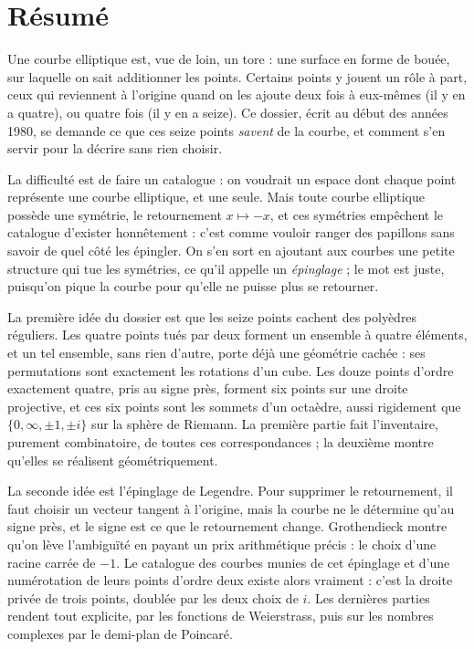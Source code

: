\documentclass[11pt,a4paper]{article}
\begin{document}
\section*{Résumé}

\begin{resume}
Une courbe elliptique est, vue de loin, un tore : une surface en forme de
bouée, sur laquelle on sait additionner les points. Certains points y jouent
un rôle à part, ceux qui reviennent à l'origine quand on les ajoute deux fois à
eux-mêmes (il y en a quatre), ou quatre fois (il y en a seize). Ce dossier,
écrit au début des années 1980, se demande ce que ces seize points
\emph{savent} de la courbe, et comment s'en servir pour la décrire sans rien
choisir.

La difficulté est de faire un catalogue : on voudrait un espace dont chaque
point représente une courbe elliptique, et une seule. Mais toute courbe
elliptique possède une symétrie, le retournement $x \mapsto -x$, et ces
symétries empêchent le catalogue d'exister honnêtement : c'est comme vouloir
ranger des papillons sans savoir de quel côté les épingler. On s'en sort en
ajoutant aux courbes une petite structure qui tue les symétries,
ce qu'il appelle un \emph{épinglage} ; le mot est juste, puisqu'on pique la
courbe pour qu'elle ne puisse plus se retourner.

La première idée du dossier est que les seize points cachent des polyèdres
réguliers. Les quatre points tués par deux forment un ensemble à quatre
éléments, et un tel ensemble, sans rien d'autre, porte déjà une géométrie
cachée : ses permutations sont exactement les rotations d'un cube. Les douze
points d'ordre exactement quatre, pris au signe près, forment six points sur
une droite projective, et ces six points sont les sommets d'un octaèdre,
aussi rigidement que $\{0, \infty, \pm 1, \pm i\}$ sur la sphère de Riemann.
La première partie fait l'inventaire, purement combinatoire, de toutes ces
correspondances ; la deuxième montre qu'elles se réalisent géométriquement.

La seconde idée est l'épinglage de Legendre. Pour supprimer le retournement, il
faut choisir un vecteur tangent à l'origine, mais la courbe ne le détermine qu'au
signe près, et le signe est ce que le retournement
change. Grothendieck montre qu'on lève l'ambiguïté en payant un prix
arithmétique précis : le choix d'une racine carrée de $-1$. Le
catalogue des courbes munies de cet épinglage et d'une numérotation de leurs
points d'ordre deux existe alors vraiment : c'est la droite privée de trois
points, doublée par les deux choix de $i$. Les dernières parties rendent tout
explicite, par les fonctions de Weierstrass, puis sur les nombres complexes par
le demi-plan de Poincaré.


\end{resume}
\end{document}

